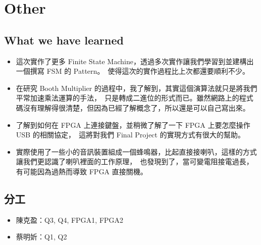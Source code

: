 \documentclass[10.5pt,compsoc,UTF8]{CjC}
\theoremstyle{mystyle}
\begin{document}
\section{Other}

\subsection{What we have learned}
\begin{itemize}
  \item 這次實作了更多 Finite State Machine，透過多次實作讓我們學習到並建構出一個撰寫 FSM 的 Pattern。\
        使得這次的實作過程比上次都還要順利不少。
  \item 在研究 Booth Multiplier 的過程中，我了解到，其實這個演算法就只是將我們平常加速乘法運算的手法，\
        只是轉成二進位的形式而已。雖然網路上的程式碼沒有理解得很清楚，但因為已經了解概念了，所以還是可以自己寫出來。
  \item 了解到如何在 FPGA 上連接鍵盤，並稍微了解了一下 FPGA 上要怎麼操作 USB 的相關協定，\
        這將對我們 Final Project 的實現方式有很大的幫助。
  \item 實際使用了一些小的音訊裝置組成一個蜂鳴器，比起直接接喇叭，這樣的方式讓我們更認識了喇叭裡面的工作原理，\
        也發現到了，當可變電阻接電過長，有可能因為過熱而導致 FPGA 直接關機。
\end{itemize}

\subsection{分工}
\begin{itemize}
  \item 陳克盈：Q3, Q4, FPGA1, FPGA2
  \item 蔡明妡：Q1, Q2
\end{itemize}
\end{document}
